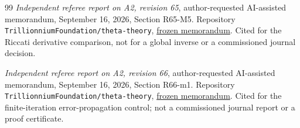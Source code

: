 \begin{thebibliography}{99}
\emph{Independent referee report on A2, revision 65},
author-requested AI-assisted memorandum, September 16, 2026,
Section R65-M5. Repository
\texttt{Trillionnium\allowbreak Foundation/\allowbreak theta-theory},
\href{https://github.com/TrillionniumFoundation/theta-theory/blob/7f4603531f7b97a23ce627fec47b7ddc5f4f9912/reviews/a2-v65-independent-harsh-top4-2026-09-16/REFEREE_REPORT.md}{frozen memorandum}.
Cited for the Riccati derivative comparison, not for a global inverse
or a commissioned journal decision.


\emph{Independent referee report on A2, revision 66},
author-requested AI-assisted memorandum, September 16, 2026,
Section R66-m1. Repository
\texttt{Trillionnium\allowbreak Foundation/\allowbreak theta-theory},
\href{https://github.com/TrillionniumFoundation/theta-theory/blob/3d49684cc6c9bad36d80c99dc46af276f53fae18/reviews/a2-v66-independent-harsh-top4-2026-09-16/REFEREE_REPORT.md}{frozen memorandum}.
Cited for the finite-iteration error-propagation control; not a
commissioned journal report or a proof certificate.

\end{thebibliography}
